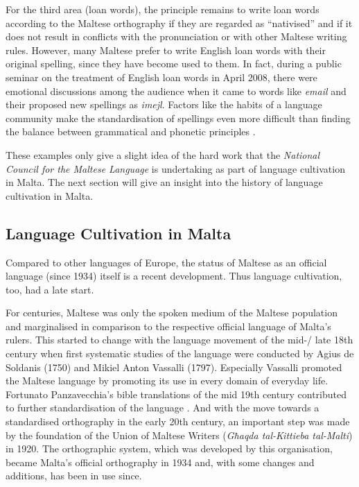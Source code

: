 \begin{multicols}{2}
For the third area (loan words), the principle remains to write loan words according to the Maltese orthography if they are regarded as ``nativised'' and if it does not result in conflicts with the pronunciation or with other Maltese writing rules. However, many Maltese prefer to write English loan words with their original spelling, since they have become used to them. In fact, during a public seminar on the treatment of English loan words in April 2008, there were emotional discussions among the audience when it came to words like \emph{email} and their proposed new spellings as \emph{imejl}. Factors like the habits of a language community make the standardisation of spellings even more difficult than finding the balance between grammatical and phonetic principles \cite{Kunsill:2008b}.

These examples only give a slight idea of the hard work that the \emph{National Council for the Maltese Language} is undertaking as part of language cultivation in Malta. The next section will give an insight into the history of language cultivation in Malta.

\subsection{Language Cultivation in Malta}

Compared to other languages of Europe, the status of Maltese as an official language (since 1934) itself is a recent development. Thus language cultivation, too, had a late start. 

For centuries, Maltese was only the spoken medium of the Maltese population and marginalised in comparison to the respective official language of Malta's rulers. This started to change with the language movement of the mid-/ late 18th century when first systematic studies of the language were conducted by Agius de Soldanis (1750) and Mikiel Anton Vassalli (1797). Especially Vassalli promoted the Maltese language by promoting its use in every domain of everyday life. Fortunato Panzavecchia's bible translations of the mid 19th century contributed to further standardisation of the language \cite{Kontzi:2005}. And with the move towards a standardised orthography in the early 20th century, an important step was made by the foundation of the Union of Maltese Writers (\emph{Għaqda tal-Kittieba tal-Malti}) in 1920. The orthographic system, which was developed by this organisation, became Malta's official orthography in 1934 and, with some changes and additions, has been in use since.


\end{multicols}
